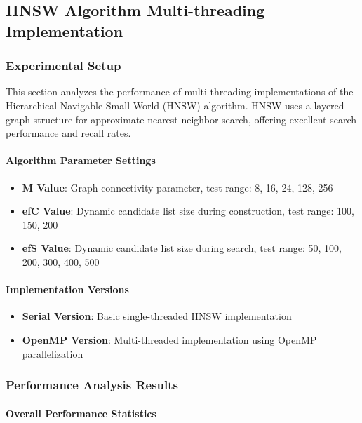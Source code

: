 \subsection{HNSW Algorithm Multi-threading Implementation}

\subsubsection{Experimental Setup}

This section analyzes the performance of multi-threading implementations of the Hierarchical Navigable Small World (HNSW) algorithm. HNSW uses a layered graph structure for approximate nearest neighbor search, offering excellent search performance and recall rates.

\paragraph{Algorithm Parameter Settings}
\begin{itemize}
    \item \textbf{M Value}: Graph connectivity parameter, test range: 8, 16, 24, 128, 256
    \item \textbf{efC Value}: Dynamic candidate list size during construction, test range: 100, 150, 200
    \item \textbf{efS Value}: Dynamic candidate list size during search, test range: 50, 100, 200, 300, 400, 500
\end{itemize}

\paragraph{Implementation Versions}
\begin{itemize}
    \item \textbf{Serial Version}: Basic single-threaded HNSW implementation
    \item \textbf{OpenMP Version}: Multi-threaded implementation using OpenMP parallelization
\end{itemize}

\subsubsection{Performance Analysis Results}

\paragraph{Overall Performance Statistics}

